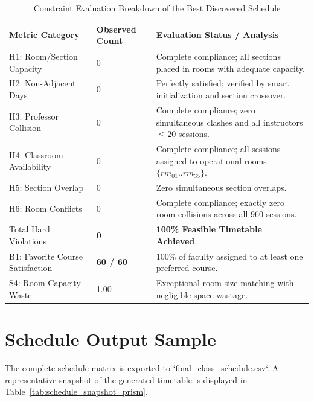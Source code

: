 \documentclass[12pt,a4paper]{report}
\begin{document}
\begin{table}[H]
  \centering
  \small
  \caption{Constraint Evaluation Breakdown of the Best Discovered Schedule}
  \label{tab:final_metrics_summary_prism}
  \begin{tabularx}{\linewidth}{L{4.5cm} C{3.0cm} X}
    \toprule
    \color{PrismWhite}\textbf{Metric Category} & 
    \color{PrismWhite}\textbf{Observed Count} & 
    \color{PrismWhite}\textbf{Evaluation Status / Analysis} \\
    \midrule
    H1: Room/Section Capacity & 0 & Complete compliance; all sections placed in rooms with adequate capacity. \\
    H2: Non-Adjacent Days & 0 & Perfectly satisfied; verified by smart initialization and section crossover. \\
    H3: Professor Collision & 0 & Complete compliance; zero simultaneous clashes and all instructors $\le 20$ sessions. \\
    H4: Classroom Availability & 0 & Complete compliance; all sessions assigned to operational rooms $\{rm_{01}..rm_{35}\}$. \\
    H5: Section Overlap & 0 & Zero simultaneous section overlaps. \\
    H6: Room Conflicts & 0 & Complete compliance; exactly zero room collisions across all 960 sessions. \\
    \midrule
    Total Hard Violations & \textbf{0} & \textbf{100\% Feasible Timetable Achieved}. \\
    \midrule
    B1: Favorite Course Satisfaction & \textbf{60 / 60} & 100\% of faculty assigned to at least one preferred course. \\
    S4: Room Capacity Waste & 1.00 & Exceptional room-size matching with negligible space wastage. \\
    \bottomrule
  \end{tabularx}
\end{table}

\section{Schedule Output Sample}
The complete schedule matrix is exported to `final_class_schedule.csv`. A representative snapshot of the generated timetable is displayed in Table~\ref{tab:schedule_snapshot_prism}.
\end{document}
